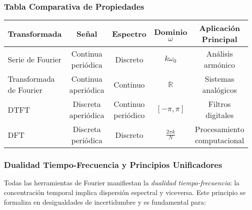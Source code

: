 \documentclass[
  11pt,
  letterpaper,
   addpoints,
   answers
  ]{exam}
\begin{document}
\subsubsection*{Tabla Comparativa de Propiedades}

\begin{center}
\begin{tabular}{|l|c|c|c|c|}
\hline
\textbf{Transformada} & \textbf{Señal} & \textbf{Espectro} & \textbf{Dominio \(\omega\)} & \textbf{Aplicación Principal} \\
\hline
Serie de Fourier & Continua periódica & Discreto & \(k\omega_0\) & Análisis armónico \\
Transformada de Fourier & Continua aperiódica & Continuo & \(\mathbb{R}\) & Sistemas analógicos \\
DTFT & Discreta aperiódica & Continuo periódico & \([-\pi, \pi]\) & Filtros digitales \\
DFT & Discreta periódica & Discreto & \(\frac{2\pi k}{N}\) & Procesamiento computacional \\
\hline
\end{tabular}
\end{center}

\subsubsection*{Dualidad Tiempo-Frecuencia y Principios Unificadores}
Todas las herramientas de Fourier manifiestan la \textit{dualidad tiempo-frecuencia}: la concentración temporal implica dispersión espectral y viceversa. Este principio se formaliza en desigualdades de incertidumbre y es fundamental para:
\end{document}
